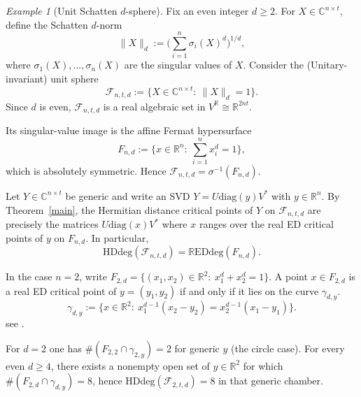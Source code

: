 \documentclass[11pt]{amsart}
\def\R{\mathbb R}\let\er\R
\def\C{\mathbb C}\let\ce\C
\theoremstyle{plain}
\theoremstyle{definition}
\theoremstyle{remark}
\newtheorem{example}[theorem]{Example}
\begin{document}
    \begin{example}[Unit Schatten $d$-sphere]\label{ex:schatten-sphere}
Fix an even integer $d\ge 2$. For $X\in\C^{n\times t}$, define the Schatten $d$-norm
\[
\|X\|_{d}:=\Big(\sum_{i=1}^n \sigma_i(X)^d\Big)^{1/d},
\]
where $\sigma_1(X),\dots,\sigma_n(X)$ are the singular values of $X$.
Consider the (Unitary-invariant) unit sphere
\[
\mathcal F_{n,t,d}:=\{X\in\C^{n\times t}:\ \|X\|_{d}=1\}.
\]
Since $d$ is even, $\mathcal F_{n,t,d}$ is a real algebraic set in $V^{\R}\cong\R^{2nt}$.

Its singular-value image is the affine Fermat hypersurface
\[
F_{n,d}:=\Big\{x\in\R^{n}:\ \sum_{i=1}^n x_i^{d}=1\Big\},
\]
which is absolutely symmetric. Hence $\mathcal F_{n,t,d}=\sigma^{-1}(F_{n,d})$.

Let $Y\in\C^{n\times t}$ be generic and write an SVD $Y=U\mathrm{diag}(y)V^*$ with $y\in\R^n$.
By Theorem~\ref{main}, the Hermitian distance critical points of $Y$ on $\mathcal F_{n,t,d}$
are precisely the matrices $U\mathrm{diag}(x)V^*$ where $x$ ranges over the real ED critical points of $y$
on $F_{n,d}$. In particular,
\[
\mathrm{HDdeg}(\mathcal F_{n,t,d})=\mathrm{\mathbb{R}EDdeg}(F_{n,d}).
\]

In the case $n=2$, write $F_{2,d}=\{(x_1,x_2)\in\R^2:\ x_1^d+x_2^d=1\}$.
A point $x\in F_{2,d}$ is a real ED critical point of $y=(y_1,y_2)$ if and only if
it lies on the curve $\gamma_{d,y}$.
\[
\gamma_{d,y}:=\Big\{x\in\R^2:\ x_1^{d-1}(x_2-y_2)=x_2^{d-1}(x_1-y_1)\Big\}.
\]
see \cite[Example 4.3]{drusvyatskiyLeeThomas2015}.

For $d=2$ one has $\#(F_{2,2}\cap\gamma_{2,y})=2$ for generic $y$ (the circle case).
For every even $d\ge 4$, there exists a nonempty open set of $y\in\R^2$ for which
$\#(F_{2,d}\cap\gamma_{d,y})=8$, hence $\mathrm{HDdeg}(\mathcal F_{2,t,d})=8$ in that generic chamber.
\end{example}
\end{document}

